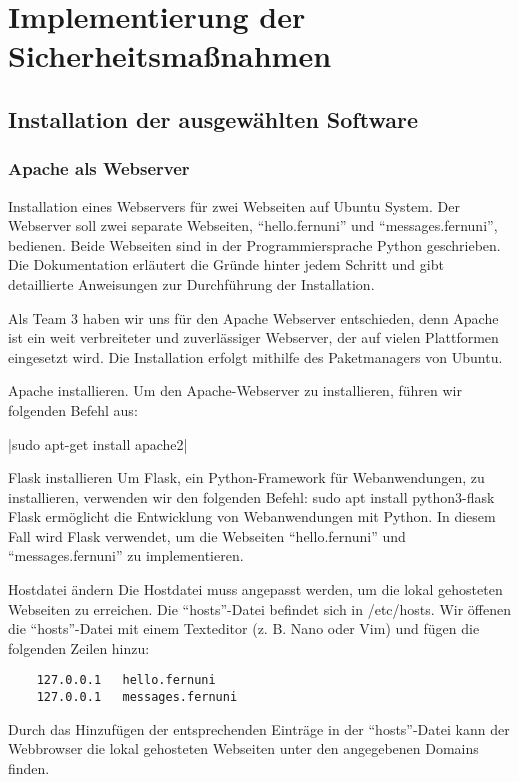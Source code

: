 \section{Implementierung der Sicherheitsmaßnahmen}

\subsection{Installation der ausgewählten Software}

\subsubsection{Apache als Webserver}

Installation eines Webservers für zwei Webseiten auf Ubuntu System.
Der Webserver soll zwei separate Webseiten, \enquote{hello.fernuni} und \enquote{messages.fernuni}, bedienen. Beide Webseiten sind in der Programmiersprache Python geschrieben. Die Dokumentation erläutert die Gründe hinter jedem Schritt und gibt detaillierte Anweisungen zur Durchführung der Installation.

Als Team 3 haben wir uns für den Apache Webserver entschieden, denn Apache ist ein weit verbreiteter und zuverlässiger Webserver, der auf vielen Plattformen eingesetzt wird. Die Installation erfolgt mithilfe des Paketmanagers von Ubuntu.

Apache installieren.
Um den Apache-Webserver zu installieren, führen wir folgenden Befehl aus:

|sudo apt-get install apache2|

Flask installieren
Um Flask, ein Python-Framework für Webanwendungen, zu installieren, verwenden wir den folgenden Befehl:
sudo apt install python3-flask
Flask ermöglicht die Entwicklung von Webanwendungen mit Python. In diesem Fall wird Flask verwendet, um die Webseiten \enquote{hello.fernuni} und \enquote{messages.fernuni} zu implementieren.

Hostdatei ändern
Die Hostdatei muss angepasst werden, um die lokal gehosteten Webseiten zu erreichen. Die \enquote{hosts}-Datei befindet sich in /etc/hosts. Wir öffenen die \enquote{hosts}-Datei mit einem Texteditor (z. B. Nano oder Vim) und fügen die folgenden Zeilen hinzu:

\begin{verbatim}
    127.0.0.1 	hello.fernuni
    127.0.0.1 	messages.fernuni
\end{verbatim}

Durch das Hinzufügen der entsprechenden Einträge in der \enquote{hosts}-Datei kann der Webbrowser die lokal gehosteten Webseiten unter den angegebenen Domains finden.

